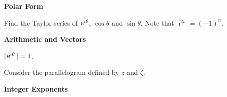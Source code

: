 {%
\begin{large}
  \noindent
  \textbf{Polar Form}
\end{large}




\begin{Hint}
  \label{hint eulers formula}
  Find the Taylor series of $\mathop{\mathrm{e}}\nolimits^{\imath \theta}$, $\cos \theta$ and $\sin \theta$.
  Note that $\imath^{2 n} = (- 1)^n$.
\end{Hint}





\begin{Hint}
  \label{hint cos 3t = cos3 t - 3 cos t sin2 t}
\end{Hint}






\begin{Hint}
  \label{hint geometric trig identity}
\end{Hint}








\begin{large}
  \noindent
  \textbf{Arithmetic and Vectors}
\end{large}


\begin{Hint}
  \label{hint modulus identities polar}
  $|\mathop{\mathrm{e}}\nolimits^{\imath \theta} | = 1$.
\end{Hint}




\begin{Hint}
  \label{hint parallelogram identity}
  Consider the parallelogram defined by $z$ and $\zeta$.
\end{Hint}






\begin{large}
  \noindent
  \textbf{Integer Exponents}
\end{large}


}
